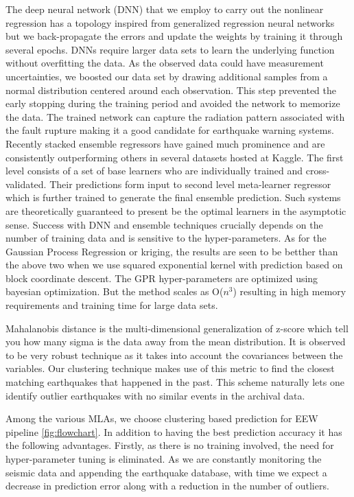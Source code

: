 \documentclass[preprint, aps, showpacs]{revtex4-1}
\begin{document}
The deep neural network (DNN) that we employ to carry out the nonlinear regression has a topology inspired from generalized regression neural networks but we back-propagate the errors and update the weights by training it through several epochs.   DNNs require larger data sets to learn the underlying function without overfitting the data. As the observed data could have measurement uncertainties, we boosted our data set by drawing additional samples from a normal distribution centered around each observation. This step prevented the early stopping during the training period and avoided the network to memorize the data.  The trained network can capture the radiation pattern associated with the fault rupture making it a good candidate for earthquake warning systems. Recently stacked ensemble regressors have gained much prominence and are consistently outperforming others in several datasets hosted at Kaggle. The first level consists of a set of base learners who are individually trained and cross-validated. Their predictions form input to second level meta-learner regressor which is further trained to generate the final ensemble prediction.  Such systems are theoretically guaranteed to present be the optimal learners in the asymptotic sense. Success with DNN and ensemble techniques crucially depends on the number of training data and is sensitive to the hyper-parameters. As for the Gaussian Process Regression or kriging, the results are seen to be betther than the above two when we use squared exponential kernel with prediction based on block coordinate descent. The GPR hyper-parameters are optimized using bayesian optimization. But the method scales as O($n^3$) resulting in high memory requirements and training time for large data sets.

Mahalanobis distance is the multi-dimensional generalization of z-score which tell you how many sigma is the data away from the mean distribution. It is observed to be very robust technique as it takes into account the covariances between the variables. Our clustering technique makes use of this metric to find the closest matching earthquakes that happened in the past. This scheme naturally lets one identify outlier earthquakes with no similar events in the archival data.

Among the various MLAs, we choose clustering based prediction for EEW pipeline \ref{fig:flowchart}. In addition to having the best prediction accuracy it has the following advantages.  Firstly, as there is no training involved, the need for hyper-parameter tuning is eliminated. As we are constantly monitoring the seismic data and appending the earthquake database, with time we expect a decrease in prediction error along with a reduction in the number of outliers. 
\end{document}
